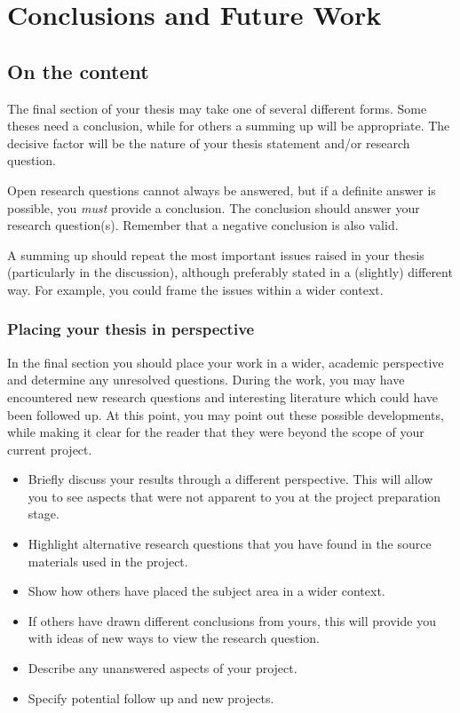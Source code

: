\chapter{Conclusions and Future Work}
\label{chp:conclusions}
\section{On the content}
The final section of your thesis may take one of several different forms. Some theses need a conclusion, while for others a summing up will be appropriate. The decisive factor will be the nature of your thesis statement and/or research question.

Open research questions cannot always be answered, but if a definite answer is possible, you \emph{must} provide a conclusion. The conclusion should answer your research question(s). Remember that a negative conclusion is also valid.

A summing up should repeat the most important issues raised in your thesis (particularly in the discussion), although preferably stated in a (slightly) different way. For example, you could frame the issues within a wider context.

\subsection{Placing your thesis in perspective}
In the final section you should place your work in a wider, academic perspective and determine any unresolved questions. During the work, you may have encountered new research questions and interesting literature which could have been followed up. At this point, you may point out these possible developments, while making it clear for the reader that they were beyond the scope of your current project.

\begin{itemize}
    \item Briefly discuss your results through a different perspective. This will allow you to see aspects that were not apparent to you at the project preparation stage.
    \item Highlight alternative research questions that you have found in the source materials used in the project.
    \item Show how others have placed the subject area in a wider context.
    \item If others have drawn different conclusions from yours, this will provide you with ideas of new ways to view the research question.
    \item Describe any unanswered aspects of your project.
    \item Specify potential follow up and new projects. 
\end{itemize}
    
